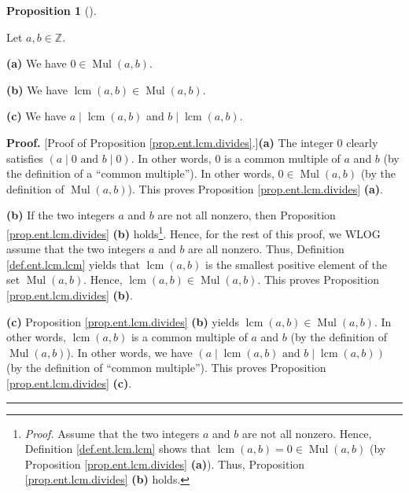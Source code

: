 \documentclass[numbers=enddot,12pt,final,onecolumn,notitlepage]{scrartcl}%
\numberwithin{exer}{subsection}
\theoremstyle{definition}
\newtheorem{prop}[theo]{Proposition}
\newenvironment{proposition}[1][]
{\begin{prop}[#1]\begin{leftbar}}
{\end{leftbar}\end{prop}}
\newenvironment{proof}[1][Proof]{\noindent\textbf{#1.} }{\ \rule{0.5em}{0.5em}}
\begin{document}
\begin{proposition}
\label{prop.ent.lcm.divides}Let $a,b\in\mathbb{Z}$.

\textbf{(a)} We have $0\in\operatorname*{Mul}\left(  a,b\right)  $.

\textbf{(b)} We have $\operatorname{lcm}\left(  a,b\right)  \in
\operatorname*{Mul}\left(  a,b\right)  $.

\textbf{(c)} We have $a\mid\operatorname{lcm}\left(  a,b\right)  $ and
$b\mid\operatorname{lcm}\left(  a,b\right)  $.
\end{proposition}

\begin{proof}
[Proof of Proposition \ref{prop.ent.lcm.divides}.]\textbf{(a)} The integer $0$
clearly satisfies $\left(  a\mid0\text{ and }b\mid0\right)  $. In other words,
$0$ is a common multiple of $a$ and $b$ (by the definition of a
\textquotedblleft common multiple\textquotedblright). In other words,
$0\in\operatorname*{Mul}\left(  a,b\right)  $ (by the definition of
$\operatorname*{Mul}\left(  a,b\right)  $). This proves Proposition
\ref{prop.ent.lcm.divides} \textbf{(a)}.

\textbf{(b)} If the two integers $a$ and $b$ are not all nonzero, then
Proposition \ref{prop.ent.lcm.divides} \textbf{(b)}
holds\footnote{\textit{Proof.} Assume that the two integers $a$ and $b$ are
not all nonzero. Hence, Definition \ref{def.ent.lcm.lcm} shows that
$\operatorname{lcm}\left(  a,b\right)  =0\in\operatorname*{Mul}\left(
a,b\right)  $ (by Proposition \ref{prop.ent.lcm.divides} \textbf{(a)}). Thus,
Proposition \ref{prop.ent.lcm.divides} \textbf{(b)} holds.}. Hence, for the
rest of this proof, we WLOG assume that the two integers $a$ and $b$ are all
nonzero. Thus, Definition \ref{def.ent.lcm.lcm} yields that
$\operatorname{lcm}\left(  a,b\right)  $ is the smallest positive element of
the set $\operatorname*{Mul}\left(  a,b\right)  $. Hence, $\operatorname{lcm}%
\left(  a,b\right)  \in\operatorname*{Mul}\left(  a,b\right)  $. This proves
Proposition \ref{prop.ent.lcm.divides} \textbf{(b)}.

\textbf{(c)} Proposition \ref{prop.ent.lcm.divides} \textbf{(b)} yields
$\operatorname{lcm}\left(  a,b\right)  \in\operatorname*{Mul}\left(
a,b\right)  $. In other words, $\operatorname{lcm}\left(  a,b\right)  $ is a
common multiple of $a$ and $b$ (by the definition of $\operatorname*{Mul}%
\left(  a,b\right)  $). In other words, we have $\left(  a\mid
\operatorname{lcm}\left(  a,b\right)  \text{ and }b\mid\operatorname{lcm}%
\left(  a,b\right)  \right)  $ (by the definition of \textquotedblleft common
multiple\textquotedblright). This proves Proposition
\ref{prop.ent.lcm.divides} \textbf{(c)}.
\end{proof}
\end{document}
